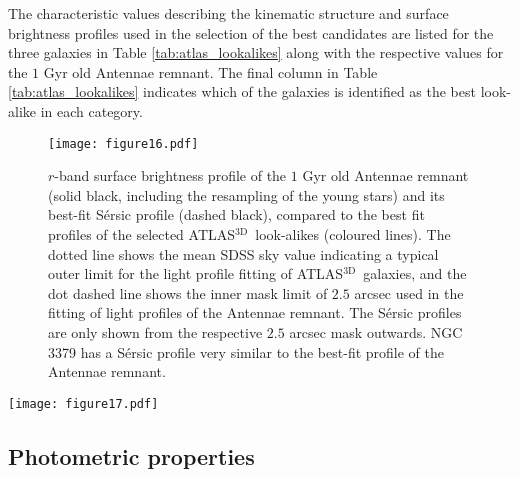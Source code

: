 \documentclass[a4paper,fleqn,usenatbib]{mnras}
\newcommand{\atlas}{\textsc{ATLAS$^\mathrm{3D}$}}
\newcommand{\skirt}{\textsc{SKIRT}}
\begin{document}
The characteristic values describing the kinematic structure and surface brightness profiles 
used in the selection of the best candidates are listed for the three
galaxies in Table \ref{tab:atlas_lookalikes} along with
the respective values for the $1$ Gyr old Antennae remnant. The final column in Table \ref{tab:atlas_lookalikes}
indicates which of the galaxies is identified as the best look-alike in each category.


\begin{figure}
\centering
\texttt{[image: figure16.pdf]}
    \caption{$r$-band surface brightness profile of the $1$ Gyr old 
Antennae remnant (solid black, including the resampling of the young stars) 
    and its best-fit S\'{e}rsic profile (dashed black),
    compared to the best fit profiles of the selected \atlas\ look-alikes (coloured lines). 
    The dotted line shows the mean SDSS sky value indicating a typical outer limit for the 
light profile fitting of \atlas\ galaxies,
    and the dot dashed line shows the inner mask limit of $2.5$ arcsec used
    in the fitting of light profiles of the Antennae remnant. The 
    S\'{e}rsic profiles are only shown from the respective $2.5$ arcsec mask outwards.
    NGC 3379 has a S\'{e}rsic profile very similar to the best-fit profile of the Antennae remnant.
   }
    \label{fig:atlas_lookalike_mu}
\end{figure}


\begin{figure*}
    \texttt{[image: figure17.pdf]}
    \caption{Left: $g$, $r$ and $i$ band colour-composite image of the \atlas\ galaxy NGC 3379 in SDSS DR7 obtained from the SDSS SkyServer. 
    The image spans $10$ times the effective radii provided in \citet{2011MNRAS.413..813C}. 
    Middle and right: $g$-, $r$-, and $i$ colour composite image of the remnant at $1$ Gyr 
    and $3$ Gyr after the final coalescence of the progenitor galaxies, produced with similar photometric
    stretch and asinh-scaling as the \atlas\ image in the left panel.
    The images are produced at the SDSS-resolution of $0.396$ arcsec$/$pix with \skirt\ (see Sec. 
\ref{section:post_processing}) including the resampling of the young stellar particles.
The images span roughly $10$ times the $r$-band effective radius of the respective galaxies and the bars show
    a scale of $1$ kpc.
    }
    \label{fig:remnant_v_atlas}
\end{figure*}

\subsection{Photometric properties}
\end{document}
